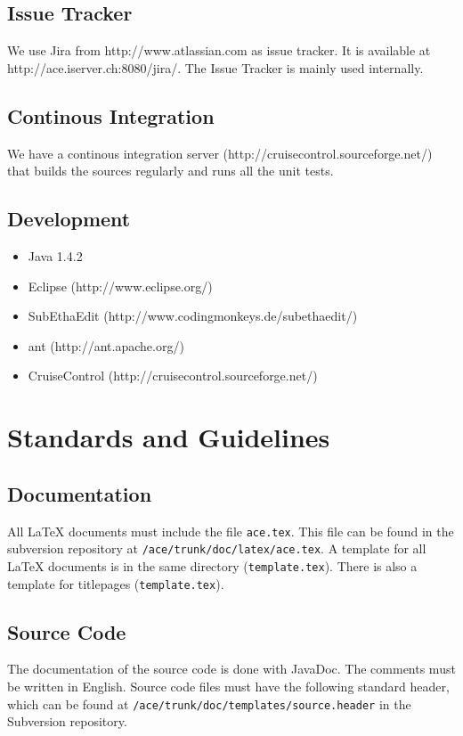 \documentclass[11pt,a4paper]{article}
\begin{document}
\subsection{Issue Tracker}
We use Jira from http://www.atlassian.com as issue tracker. It is available
at http://ace.iserver.ch:8080/jira/. The Issue Tracker is mainly used internally.

\subsection{Continous Integration}
We have a continous integration server (http://cruisecontrol.sourceforge.net/) that builds the
sources regularly and runs all the unit tests.

\subsection{Development}
\begin{itemize}
 \item Java 1.4.2
 \item Eclipse (http://www.eclipse.org/)
 \item SubEthaEdit (http://www.codingmonkeys.de/subethaedit/)
 \item ant (http://ant.apache.org/)
 \item CruiseControl (http://cruisecontrol.sourceforge.net/)
\end{itemize}


\section{Standards and Guidelines}

\subsection{Documentation}
All \LaTeX{} documents must include the file \texttt{ace.tex}. This file can be found in the subversion repository at \texttt{/ace/trunk/doc/latex/ace.tex}.
A template for all \LaTeX{} documents is in the same directory (\texttt{template.tex}). There is also a template for titlepages (\texttt{template.tex}).

\subsection{Source Code}
The documentation of the source code is done with JavaDoc. The comments must be written in English. Source code files must have the following standard header,
which can be found at \texttt{/ace/trunk/doc/templates/source.header} in the Subversion repository.
\end{document}
